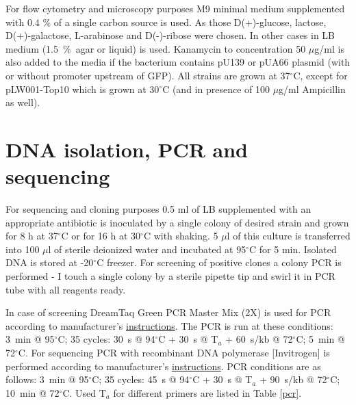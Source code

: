 For flow cytometry and microscopy purposes M9 minimal medium supplemented with 0.4 \% of a single carbon source is used.
As those D(+)-glucose, lactose, D(+)-galactose, L-arabinose and D(-)-ribose were chosen.
In other cases in LB medium (1.5~\%~agar or liquid) is used.
Kanamycin to concentration 50 $\mu$g/ml is also added to the media if the bacterium contains pU139 or pUA66 plasmid (with or without promoter upstream of GFP).
All strains are grown at 37$^{\circ}$C, except for pLW001-Top10 which is grown at 30$^{\circ}$C (and in presence of 100 $\mu$g/ml Ampicillin as well).


\section{DNA isolation, PCR and sequencing}
For sequencing and cloning purposes 0.5 ml of LB supplemented with an appropriate antibiotic is inoculated by a single colony of desired strain and grown for 8 h at 37$^{\circ}$C or for 16 h at 30$^{\circ}$C with shaking.
5 $\mu$l of this culture is transferred into 100 $\mu$l of sterile deionized water and incubated at 95$^{\circ}$C for 5 min.
Isolated DNA is stored at -20$^{\circ}$C freezer.
For screening of positive clones a colony PCR is performed - I touch a single colony by a sterile pipette tip and swirl it in PCR tube with all reagents ready.

In case of screening DreamTaq Green PCR Master Mix (2X) is used for PCR according to manufacturer's \href{https://assets.thermofisher.com/TFS-Assets/LSG/manuals/MAN0012704_DreamTaq_Green_PCR_MasterMix_K1081_UG.pdf}{instructions}.
The PCR is run at these conditions: 3~min @ 95$^{\circ}$C; 35 cycles: 30~s @ 94$^{\circ}$C + 30~s @ T$_{a}$ + 60~s/kb @ 72$^{\circ}$C; 5~min @ 72$^{\circ}$C.
For sequencing PCR with recombinant  DNA polymerase [Invitrogen] is performed according to manufacturer's \href{https://assets.thermofisher.com/TFS-Assets/LSG/manuals/0814_Taq_DNA_Polymerase_recombinant.pdf}{instructions}.
PCR conditions are as follows: 3~min @ 95$^{\circ}$C; 35 cycles: 45~s @ 94$^{\circ}$C + 30~s @ T$_{a}$ + 90~s/kb @ 72$^{\circ}$C; 10~min @ 72$^{\circ}$C. Used T$_{a}$ for different primers are listed in Table \ref{pcr}.

